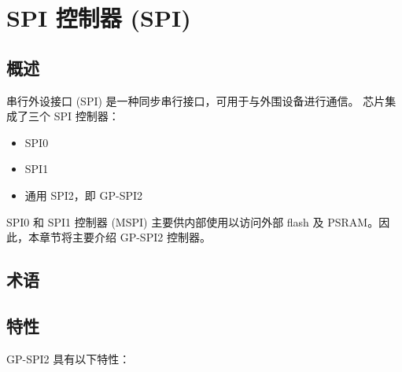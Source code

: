 \documentclass[main\_\_CN.tex]{subfiles}
\begin{document}

\ifglobal
\else
    {\let\clearpage\relax \listoftodos}
    {\let\clearpage\relax \listofdonetodos}
    \tableofcontents
\fi




\hypertarget{spi}{}
\chapter{SPI 控制器 (SPI)}
\label{mod:spi}

\section{概述}

串行外设接口 (SPI) 是一种同步串行接口，可用于与外围设备进行通信。
\chipname{} 芯片集成了三个 SPI 控制器：
\begin{itemize}
  \item SPI0
  \item SPI1
  \item 通用 SPI2，即 GP-SPI2
\end{itemize}
SPI0 和 SPI1 控制器 (MSPI) 主要供内部使用以访问外部 flash 及 PSRAM。因此，本章节将主要介绍 GP-SPI2 控制器。

\section{术语}


\vspace{-2em}
\section{特性}

GP-SPI2 具有以下特性：
\end{document}
